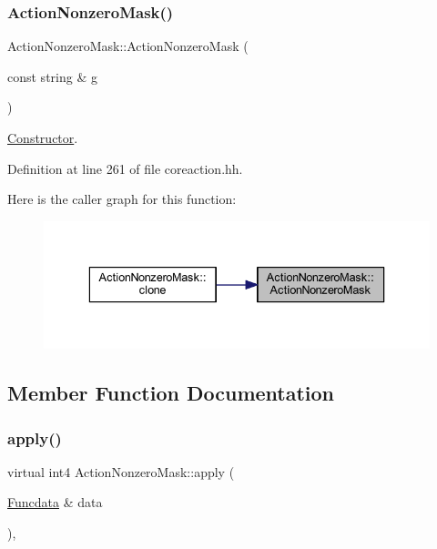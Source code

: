 \subsubsection{\texorpdfstring{ActionNonzeroMask()}{ActionNonzeroMask()}}
{\footnotesize\ttfamily Action\+Nonzero\+Mask\+::\+Action\+Nonzero\+Mask (\begin{DoxyParamCaption}\item[{const string \&}]{g }\end{DoxyParamCaption})\hspace{0.3cm}{\ttfamily [inline]}}



\mbox{\hyperlink{class_constructor}{Constructor}}. 



Definition at line 261 of file coreaction.\+hh.

Here is the caller graph for this function\+:
\nopagebreak
\begin{figure}[H]
\begin{center}
\leavevmode
\includegraphics[width=336pt]{class_action_nonzero_mask_ab206a03a946f6e7e138c5e057154c569_icgraph}
\end{center}
\end{figure}


\subsection{Member Function Documentation}
\mbox{\label{class_action_nonzero_mask_a585181ff1ba9a3ce19de0c9e939ac381}} 
\subsubsection{\texorpdfstring{apply()}{apply()}}
{\footnotesize\ttfamily virtual int4 Action\+Nonzero\+Mask\+::apply (\begin{DoxyParamCaption}\item[{\mbox{\hyperlink{class_funcdata}{Funcdata}} \&}]{data }\end{DoxyParamCaption})\hspace{0.3cm}{\ttfamily [inline]}, {\ttfamily [virtual]}}



